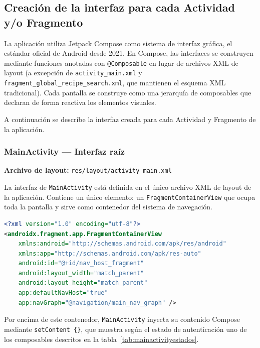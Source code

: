 \documentclass[stu, 12pt, letterpaper, donotrepeattitle, floatsintext, natbib]{apa7}
\begin{document}
\subsection{Creación de la interfaz para cada Actividad y/o Fragmento}
\label{sec:creacioninterfaz}

La aplicación utiliza Jetpack Compose como sistema de interfaz gráfica, el estándar
oficial de Android desde 2021. En Compose, las interfaces se construyen mediante
funciones anotadas con \texttt{@Composable} en lugar de archivos XML de layout (a
excepción de \texttt{activity\_main.xml} y \texttt{fragment\_global\_recipe\_search.xml},
que mantienen el esquema XML tradicional). Cada pantalla se construye como una jerarquía
de composables que declaran de forma reactiva los elementos visuales.

A continuación se describe la interfaz creada para cada Actividad y Fragmento de la
aplicación.

\subsubsection{MainActivity --- Interfaz raíz}

\noindent\textbf{Archivo de layout:} \texttt{res/layout/activity\_main.xml}

La interfaz de \texttt{MainActivity} está definida en el único archivo XML de layout de
la aplicación. Contiene un único elemento: un \texttt{FragmentContainerView} que ocupa
toda la pantalla y sirve como contenedor del sistema de navegación.

\begin{lstlisting}[language=XML, caption={Layout XML de activity\_main.xml}]
<?xml version="1.0" encoding="utf-8"?>
<androidx.fragment.app.FragmentContainerView
    xmlns:android="http://schemas.android.com/apk/res/android"
    xmlns:app="http://schemas.android.com/apk/res-auto"
    android:id="@+id/nav_host_fragment"
    android:layout_width="match_parent"
    android:layout_height="match_parent"
    app:defaultNavHost="true"
    app:navGraph="@navigation/main_nav_graph" />
\end{lstlisting}

Por encima de este contenedor, \texttt{MainActivity} inyecta su contenido Compose
mediante \texttt{setContent \{\}}, que muestra según el estado de autenticación uno de
los composables descritos en la tabla~\ref{tab:mainactivityestados}.
\end{document}
